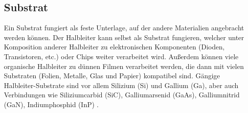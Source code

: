 \subsection{\label{subsec:FZV5}Substrat}
Ein Substrat fungiert als feste Unterlage, auf der andere Materialien angebracht werden können. 
Der Halbleiter kann selbst als Substrat fungieren, welcher unter Komposition 
anderer Halbleiter zu elektronischen Komponenten (Dioden, Transistoren, etc.) oder Chips weiter verarbeitet wird. 
Außerdem können viele organische Halbleiter zu dünnen Filmen verarbeitet werden, die dann mit vielen Substraten 
(Folien, Metalle, Glas und Papier) kompatibel sind.  
Gängige Halbleiter-Substrate sind vor allem Silizium (Si) und Gallium (Ga), aber auch Verbindungen wie 
Siliziumcarbid (SiC), Galliumarsenid (GaAs), Galliumnitrid (GaN), Indiumphosphid (InP) \cite{Substrat, EPC}. 